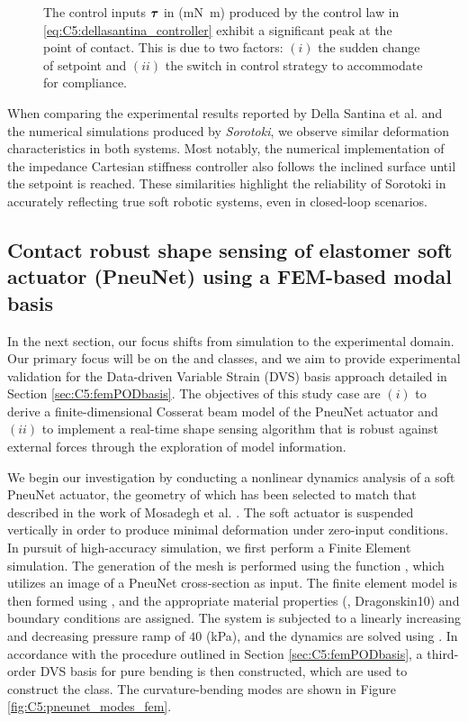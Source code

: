 {\begin{figure}[!t]
    \caption{The control inputs $\boldsymbol{\tau}$ in (\si{\milli \newton \meter}) produced by the control law in \eqref{eq:C5:dellasantina_controller} exhibit a significant peak at the point of contact. This is due to two factors: $(i)$ the sudden change of setpoint and $(ii)$ the switch in control strategy to accommodate for compliance.}
    \label{fig:C5:dellasantina_input}
\end{figure}
\clearpage
}

When comparing the experimental results reported by Della Santina et al. \cite{DellaSantina2020Jan} and the numerical simulations produced by \textit{Sorotoki}, we observe similar deformation characteristics in both systems. Most notably, the numerical implementation of the impedance Cartesian stiffness controller also follows the inclined surface until the setpoint is reached. These similarities highlight the reliability of Sorotoki in accurately reflecting true soft robotic systems, even in closed-loop scenarios. 

\subsection[Contact robust shape sensing of elastomer soft actuator]{Contact robust shape sensing of elastomer soft actuator (PneuNet) using a FEM-based modal basis}
In the next section, our focus shifts from simulation to the experimental domain. Our primary focus will be on the  and  classes, and we aim to provide experimental validation for the Data-driven Variable Strain (DVS) basis approach detailed in Section \ref{sec:C5:femPODbasis}. The objectives of this study case are $(i)$ to derive a finite-dimensional Cosserat beam model of the PneuNet actuator and $(ii)$ to implement a real-time shape sensing algorithm that is robust against external forces through the exploration of model information.

We begin our investigation by conducting a nonlinear dynamics analysis of a soft PneuNet actuator, the geometry of which has been selected to match that described in the work of Mosadegh et al. \cite{Mosadegh2014}. The soft actuator is suspended vertically in order to produce minimal deformation under zero-input conditions. In pursuit of high-accuracy simulation, we first perform a Finite Element simulation. The generation of the mesh is performed using the function , which utilizes an image of a PneuNet cross-section as input. The finite element model is then formed using , and the appropriate material properties (\ie, Dragonskin10) and boundary conditions are assigned. The system is subjected to a linearly increasing and decreasing pressure ramp of $40$ (\si{\kilo \pascal}), and the dynamics are solved using . In accordance with the procedure outlined in Section \ref{sec:C5:femPODbasis}, a third-order DVS basis for pure bending is then constructed, which are used to construct the  class. The curvature-bending modes are shown in Figure \ref{fig:C5:pneunet_modes_fem}. 
%

